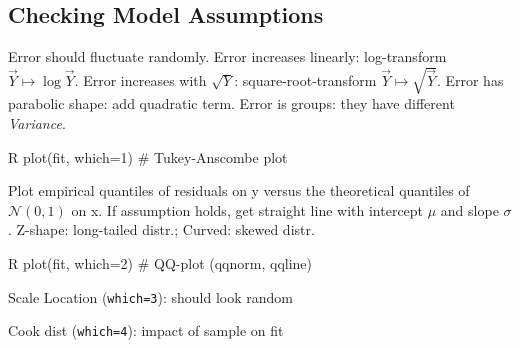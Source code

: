 \subsection{Checking Model Assumptions}\label{subsec:checking_model_assumptions}
\begin{sectionbox}\nospacing{}
  Error should fluctuate randomly. Error increases linearly: log-transform $\vec{Y} \mapsto \log{\vec{Y}}$. Error increases with $\sqrt{Y}$: square-root-transform $\vec{Y} \mapsto \sqrt{\vec{Y}}$. Error has parabolic shape: add quadratic term. Error is groups: they have different \textit{Variance}.
  \begin{mintlinebox}{R}
    plot(fit, which=1) # Tukey-Anscombe plot
  \end{mintlinebox}
\end{sectionbox}
\begin{sectionbox}\nospacing{}
  Plot empirical quantiles of residuals on y versus the theoretical quantiles of $\mathcal{N}(0,1)$ on x.
  If assumption holds, get straight line with intercept $\mu$ and slope $\sigma$.
  Z-shape: long-tailed distr.; Curved: skewed distr.
  \begin{mintlinebox}{R}
    plot(fit, which=2) # QQ-plot (qqnorm, qqline)
  \end{mintlinebox}
\end{sectionbox}
\begin{notebox}\nospacing{}
  \begin{enumeratenosep}[label=\roman*]
    \item Scale Location (\texttt{which=3}): should look random
    \item Cook dist (\texttt{which=4}): impact of sample on fit
  \end{enumeratenosep}
\end{notebox}

